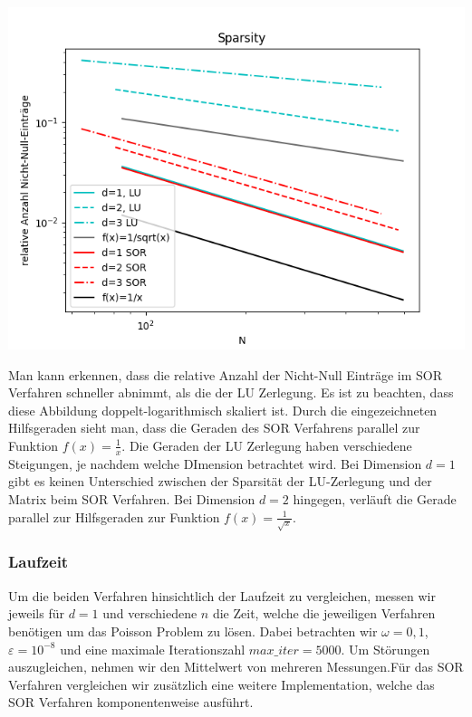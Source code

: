 \documentclass[smallheadings]{scrartcl}
\theoremstyle{definition}
\begin{document}
\begin{minipage}{\textwidth}

 \centering
 \includegraphics[scale = 0.9]{Sparsity1}
 	\label{sparsity}

 \end{minipage}

Man kann erkennen, dass die relative Anzahl der Nicht-Null Einträge im SOR Verfahren schneller abnimmt, als die der LU Zerlegung.  Es ist zu beachten, dass diese Abbildung doppelt-logarithmisch  skaliert ist.  Durch die eingezeichneten Hilfsgeraden sieht man, dass die Geraden des SOR Verfahrens parallel zur Funktion $f(x)=\frac{1}{x}$. Die Geraden der LU Zerlegung haben verschiedene Steigungen,  je nachdem welche DImension betrachtet wird. Bei Dimension $d=1$ gibt es keinen Unterschied zwischen der Sparsität der LU-Zerlegung und der Matrix beim SOR Verfahren.  Bei Dimension $d=2$ hingegen, verläuft die Gerade parallel zur Hilfsgeraden zur Funktion $f(x)=\frac{1}{\sqrt{x}}$. 

\subsubsection{Laufzeit}
Um die beiden Verfahren hinsichtlich der Laufzeit zu vergleichen,  messen wir jeweils für $d=1$ und verschiedene $n$ die Zeit, welche die jeweiligen Verfahren benötigen um das Poisson Problem zu lösen.  Dabei betrachten wir $\omega =0,1$, $\varepsilon = 10^{-8}$ und eine maximale Iterationszahl $max\_ iter = 5000$.  Um Störungen auszugleichen,  nehmen wir den Mittelwert von mehreren Messungen.Für das SOR Verfahren vergleichen wir zusätzlich eine weitere Implementation,  welche das SOR Verfahren komponentenweise ausführt. 
\end{document}
